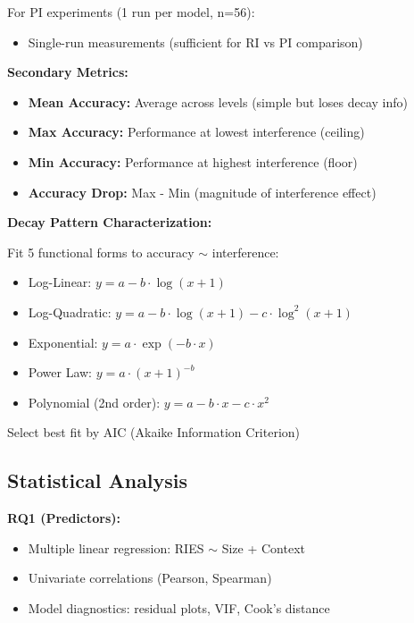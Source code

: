 \documentclass{article}
\begin{document}
For PI experiments (1 run per model, n=56):
\begin{itemize}[itemsep=2pt,topsep=3pt,parsep=0pt]
    \item Single-run measurements (sufficient for RI vs PI comparison)
\end{itemize}

\textbf{Secondary Metrics:}
\begin{itemize}[itemsep=2pt,topsep=3pt,parsep=0pt]
    \item \textbf{Mean Accuracy:} Average across levels (simple but loses decay info)
    \item \textbf{Max Accuracy:} Performance at lowest interference (ceiling)
    \item \textbf{Min Accuracy:} Performance at highest interference (floor)
    \item \textbf{Accuracy Drop:} Max - Min (magnitude of interference effect)
\end{itemize}

\textbf{Decay Pattern Characterization:}

Fit 5 functional forms to accuracy $\sim$ interference:
\begin{itemize}[itemsep=2pt,topsep=3pt,parsep=0pt]
    \item Log-Linear: $y = a - b \cdot \log(x + 1)$
    \item Log-Quadratic: $y = a - b \cdot \log(x+1) - c \cdot \log^2(x+1)$
    \item Exponential: $y = a \cdot \exp(-b \cdot x)$
    \item Power Law: $y = a \cdot (x+1)^{-b}$
    \item Polynomial (2nd order): $y = a - b \cdot x - c \cdot x^2$
\end{itemize}

Select best fit by AIC (Akaike Information Criterion)

\subsection{Statistical Analysis}

\textbf{RQ1 (Predictors):}
\begin{itemize}[itemsep=2pt,topsep=3pt,parsep=0pt]
    \item Multiple linear regression: RIES $\sim$ Size + Context
    \item Univariate correlations (Pearson, Spearman)
    \item Model diagnostics: residual plots, VIF, Cook's distance
\end{itemize}
\end{document}
